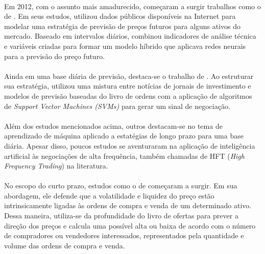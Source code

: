 \documentclass[grad,numbers]{coppe}
\begin{document}
        \paragraph{}Em 2012, com o assunto mais amadurecido, começaram a surgir trabalhos como o de \citet{adebiyi-ayodele}. Em seus estudos, utilizou dados públicos disponíveis na Internet para modelar uma estratégia de previsão de preços futuros para alguns ativos do mercado. Baseado em intervalos diários, combinou indicadores de análise técnica e variáveis criadas para formar um modelo híbrido que aplicava redes neurais para a previsão do preço futuro.
        
        \paragraph{}Ainda em uma base diária de previsão, destaca-se o trabalho de \citet{xiaodong-li}. Ao estruturar sua estratégia, utilizou uma mistura entre notícias de jornais de investimento e modelos de previsão baseadas do livro de ordens com a aplicação de algoritmos de \textit{Support Vector Machines (SVMs)} para gerar um sinal de negociação.
        
        \paragraph{}Além dos estudos mencionados acima, outros destacam-se no tema de aprendizado de máquina aplicado a estatégias de longo prazo para uma base diária. Apesar disso, poucos estudos se aventuraram na aplicação de inteligência artificial às negociações de alta frequência, também chamadas de HFT (\textit{High Frequency Trading}) na literatura.
        
        \paragraph{}No escopo do curto prazo, estudos como o de \citet{dixon-hft} começaram a surgir. Em sua abordagem, ele defende que a volatilidade e liquidez do preço estão intrinsicamente ligadas às ordens de compra e venda de um determinado ativo. Dessa maneira, utiliza-se da profundidade do livro de ofertas para prever a direção dos preços e calcula uma possível alta ou baixa de acordo com o número de compradores ou vendedores interessados, representados pela quantidade e volume das ordens de compra e venda.
        
\end{document}
